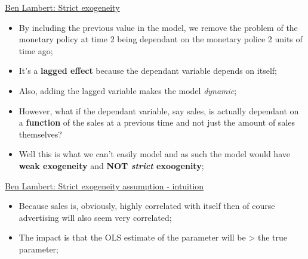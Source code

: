 \documentclass[12pt, titlepage, french]{report}
\begin{document}
\begin{YTB_SUMM}{\href{https://www.youtube.com/watch?v=LgIOgb-6mYA&list=PLvo9ZnEQG5oXC-cg8ecXr6SJZWprEL1UC&index=3}{Ben Lambert: Strict exogeneity}}
\begin{itemize}
	\item	By including the previous value in the model, we remove the problem of the monetary policy at time 2 being dependant on the monetary police 2 units of time ago;
	\item	It’s a \textbf{lagged effect} because the dependant variable depends on itself;
	\item	Also, adding the lagged variable makes the model \textit{dynamic};
	\item	However, what if the dependant variable, say sales, is actually dependant on a \textbf{function} of the sales at a previous time and not just the amount of sales themselves?
	\item	Well this is what we can't easily model and as such the model would have \textbf{weak exogeneity} and \textbf{NOT \textit{strict} exoogenity};
\end{itemize}
\end{YTB_SUMM}

\begin{YTB_SUMM}{\href{https://www.youtube.com/watch?v=a7_3qX67e7c&list=PLvo9ZnEQG5oXC-cg8ecXr6SJZWprEL1UC&index=4}{Ben Lambert: Strict exogeneity assumption - intuition}}
\begin{itemize}
	\item	Because sales is, obviously, highly correlated with itself then of course advertising will also seem very correlated;
	\item	The impact is that the OLS estimate of the parameter will be > the true parameter;
\end{itemize}
\end{YTB_SUMM}
\end{document}
